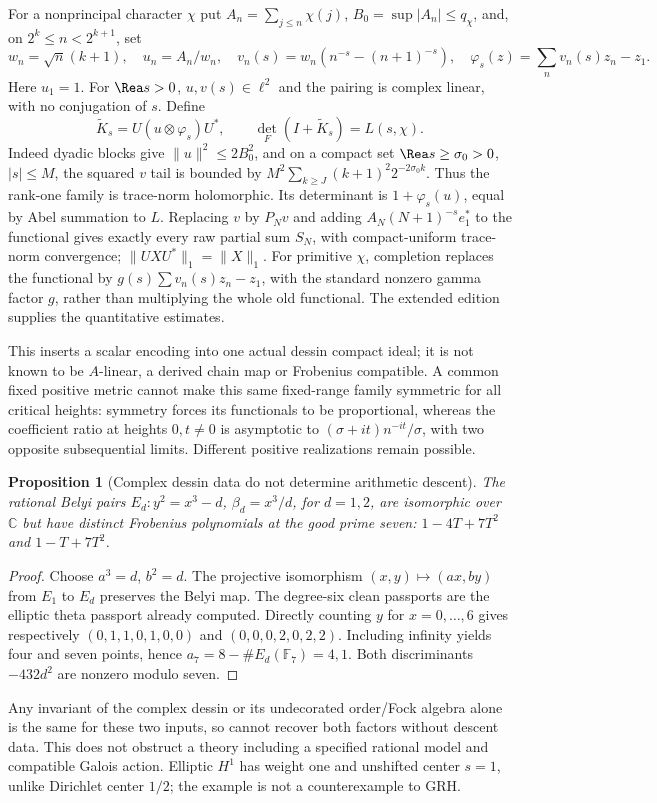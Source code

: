 \documentclass[11pt]{article}
\newtheorem{proposition}[theorem]{Proposition}
\theoremstyle{definition}\newtheorem{definition}[theorem]{Definition}
\theoremstyle{remark}\newtheorem{remark}[theorem]{Remark}
\newcommand{\C}{\mathbb C}\newcommand{\Z}{\mathbb Z}\newcommand{\R}{\mathbb R}
\begin{document}
For a nonprincipal character $\chi$ put $A_n=\sum_{j\le n}\chi(j)$, $B_0=\sup|A_n|\le q_\chi$, and, on $2^k\le n<2^{k+1}$, set
\[
 w_n=\sqrt n(k+1),\quad u_n=A_n/w_n,\quad
 v_n(s)=w_n(n^{-s}-(n+1)^{-s}),\quad
 \varphi_s(z)=\sum_n v_n(s)z_n-z_1.
\]
Here $u_1=1$. For $\Rea s>0$, $u,v(s)\in\ell^2$ and the pairing is complex linear, with no conjugation of $s$. Define
\[
 \widetilde K_s=U(u\otimes\varphi_s)U^*,\qquad
 \det_F(I+\widetilde K_s)=L(s,\chi).
\]
Indeed dyadic blocks give $\|u\|^2\le2B_0^2$, and on a compact set $\Rea s\ge\sigma_0>0$, $|s|\le M$, the squared $v$ tail is bounded by $M^2\sum_{k\ge J}(k+1)^2 2^{-2\sigma_0k}$. Thus the rank-one family is trace-norm holomorphic. Its determinant is $1+\varphi_s(u)$, equal by Abel summation to $L$. Replacing $v$ by $P_Nv$ and adding $A_N(N+1)^{-s}e_1^*$ to the functional gives exactly every raw partial sum $S_N$, with compact-uniform trace-norm convergence; $\|UXU^*\|_1=\|X\|_1$. For primitive $\chi$, completion replaces the functional by $g(s)\sum v_n(s)z_n-z_1$, with the standard nonzero gamma factor $g$, rather than multiplying the whole old functional. The extended edition supplies the quantitative estimates.

This inserts a scalar encoding into one actual dessin compact ideal; it is not known to be $A$-linear, a derived chain map or Frobenius compatible. A common fixed positive metric cannot make this same fixed-range family symmetric for all critical heights: symmetry forces its functionals to be proportional, whereas the coefficient ratio at heights $0,t\ne0$ is asymptotic to $(\sigma+it)n^{-it}/\sigma$, with two opposite subsequential limits. Different positive realizations remain possible.

\begin{proposition}[Complex dessin data do not determine arithmetic descent]\label{thm:descent}
The rational Belyi pairs $E_d:y^2=x^3-d$, $\beta_d=x^3/d$, for $d=1,2$, are isomorphic over $\C$ but have distinct Frobenius polynomials at the good prime seven: $1-4T+7T^2$ and $1-T+7T^2$.
\end{proposition}
\begin{proof}
Choose $a^3=d$, $b^2=d$. The projective isomorphism $(x,y)\mapsto(ax,by)$ from $E_1$ to $E_d$ preserves the Belyi map. The degree-six clean passports are the elliptic theta passport already computed. Directly counting $y$ for $x=0,\ldots,6$ gives respectively $(0,1,1,0,1,0,0)$ and $(0,0,0,2,0,2,2)$. Including infinity yields four and seven points, hence $a_7=8-\#E_d(\mathbb F_7)=4,1$. Both discriminants $-432d^2$ are nonzero modulo seven.
\end{proof}
Any invariant of the complex dessin or its undecorated order/Fock algebra alone is the same for these two inputs, so cannot recover both factors without descent data. This does not obstruct a theory including a specified rational model and compatible Galois action. Elliptic $H^1$ has weight one and unshifted center $s=1$, unlike Dirichlet center $1/2$; the example is not a counterexample to GRH.
\end{document}
